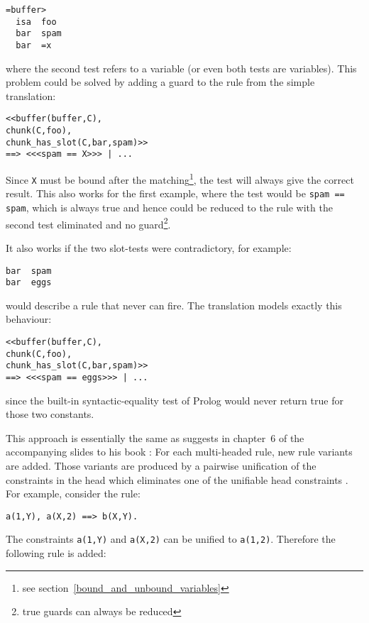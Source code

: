\begin{lstlisting}
=buffer>
  isa  foo
  bar  spam
  bar  =x
\end{lstlisting}

where the second test refers to a variable (or even both tests are variables). This problem could be solved by adding a guard to the rule from the simple translation:

\begin{lstlisting}
<<buffer(buffer,C),
chunk(C,foo),
chunk_has_slot(C,bar,spam)>>
==> <<<spam == X>>> | ...
\end{lstlisting}

Since \lstinline|X| must be bound after the matching\footnote{see section~\ref{bound_and_unbound_variables}}, the test will always give the correct result. This also works for the first example, where the test would be \lstinline|spam == spam|, which is always true and hence could be reduced to the rule with the second test eliminated and no guard\footnote{true guards can always be reduced}.

It also works if the two slot-tests were contradictory, for example: 

\begin{lstlisting}
bar  spam
bar  eggs
\end{lstlisting}

would describe a rule that never can fire. The translation models exactly this behaviour:

\begin{lstlisting}
<<buffer(buffer,C),
chunk(C,foo),
chunk_has_slot(C,bar,spam)>>
==> <<<spam == eggs>>> | ...
\end{lstlisting}

since the built-in syntactic-equality test of Prolog would never return true for those two constants.

This approach is essentially the same as \citeauthor{chr_lecture_chap6} suggests in chapter~6 of the accompanying slides to his book \cite{fru_chr_book_2009}: For each multi-headed rule, new rule variants are added. Those variants are produced by a pairwise unification of the constraints in the head which eliminates one of the unifiable head constraints \cite{chr_lecture_chap6}. For example, consider the rule:

\begin{lstlisting}
a(1,Y), a(X,2) ==> b(X,Y).
\end{lstlisting}

The constraints \lstinline|a(1,Y)| and \lstinline|a(X,2)| can be unified to \lstinline|a(1,2)|. Therefore the following rule is added:

